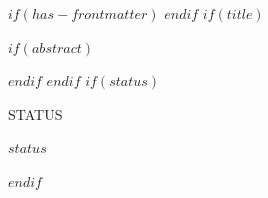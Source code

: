 $if(has-frontmatter)$
\frontmatter
$endif$
$if(title)$
\maketitle
$if(abstract)$
\begin{abstract}
$abstract$
\end{abstract}
$endif$
$endif$
$if(status)$
\par\vspace{0.7em}
\noindent{\color{policyengineaccent}\rule{\linewidth}{0.5pt}}\par
\vspace{0.4em}
{\policyenginemono\fontsize{7}{9}\selectfont STATUS\par}
\vspace{0.25em}
\begingroup\small\sffamily
$status$
\par\endgroup
\vspace{0.9em}
$endif$

